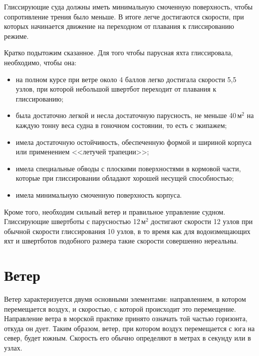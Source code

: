 \documentclass[a4paper, 12pt, twoside, final]{scrbook}
\begin{document}
Глиссирующие суда должны иметь минимальную смоченную поверхность, чтобы сопротивление трения было меньше. В итоге легче достигаются скорости, при которых начинается движение на переходном от плавания к глиссированию режиме.

Кратко подытожим сказанное. Для того чтобы парусная яхта глиссировала, необходимо, чтобы она:
\begin{itemize}
\item на полном курсе при ветре около 4 баллов легко достигала скорости 5,5 узлов, при которой небольшой швертбот переходит от плавания к глиссированию;
\item была достаточно легкой и несла достаточную парусность, не меньше 40\,м$^2$ на каждую тонну веса судна в гоночном состоянии, то есть с экипажем;
\item имела достаточную остойчивость, обеспеченную формой и шириной корпуса или применением <<летучей трапеции>>;
\item имела специальные обводы с плоскими поверхностями в кормовой части, которые при глиссировании обладают хорошей несущей способностью;
\item имела минимальную смоченную поверхность корпуса.
\end{itemize}

Кроме того, необходим сильный ветер и правильное управление судном. Глиссирующие швертботы с парусностью 12\,м$^2$ достигают скорости 12 узлов при обычной скорости глиссирования 10 узлов, в то время как для водоизмещающих яхт и швертботов подобного размера такие скорости совершенно нереальны.

\section{Ветер}

Ветер характеризуется двумя основными элементами: направлением, в котором перемещается воздух, и скоростью, с которой происходит это перемещение. Направление ветра в морской практике принято означать той частью горизонта, откуда он дует. Таким образом, ветер, при котором воздух перемещается с юга на север, будет южным. Скорость его обычно определяют в метрах в секунду или в узлах.
\end{document}
